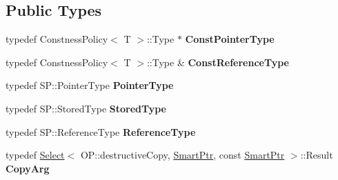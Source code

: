 \subsection*{Public Types}
\begin{DoxyCompactItemize}
\item 
\hypertarget{classLoki_1_1SmartPtr_a82c386516bb52546d0d165e2a01d5659}{}typedef Constness\+Policy$<$ T $>$\+::Type $\ast$ {\bfseries Const\+Pointer\+Type}\label{classLoki_1_1SmartPtr_a82c386516bb52546d0d165e2a01d5659}

\item 
\hypertarget{classLoki_1_1SmartPtr_aa9c4b0bdbaa1e4246b3ae5f10b1b6fdd}{}typedef Constness\+Policy$<$ T $>$\+::Type \& {\bfseries Const\+Reference\+Type}\label{classLoki_1_1SmartPtr_aa9c4b0bdbaa1e4246b3ae5f10b1b6fdd}

\item 
\hypertarget{classLoki_1_1SmartPtr_a184565f8f72ed2555f1c6f6cb0496f01}{}typedef S\+P\+::\+Pointer\+Type {\bfseries Pointer\+Type}\label{classLoki_1_1SmartPtr_a184565f8f72ed2555f1c6f6cb0496f01}

\item 
\hypertarget{classLoki_1_1SmartPtr_ad9fc9e0139194cb862df369bd07c1861}{}typedef S\+P\+::\+Stored\+Type {\bfseries Stored\+Type}\label{classLoki_1_1SmartPtr_ad9fc9e0139194cb862df369bd07c1861}

\item 
\hypertarget{classLoki_1_1SmartPtr_a6d91056f1394ad68d27584d22da7934d}{}typedef S\+P\+::\+Reference\+Type {\bfseries Reference\+Type}\label{classLoki_1_1SmartPtr_a6d91056f1394ad68d27584d22da7934d}

\item 
\hypertarget{classLoki_1_1SmartPtr_ace87f19b4c7dccc630c69b703bf14b36}{}typedef \hyperlink{structLoki_1_1Select}{Select}$<$ O\+P\+::destructive\+Copy, \hyperlink{classLoki_1_1SmartPtr}{Smart\+Ptr}, const \hyperlink{classLoki_1_1SmartPtr}{Smart\+Ptr} $>$\+::Result {\bfseries Copy\+Arg}\label{classLoki_1_1SmartPtr_ace87f19b4c7dccc630c69b703bf14b36}

\end{DoxyCompactItemize}
